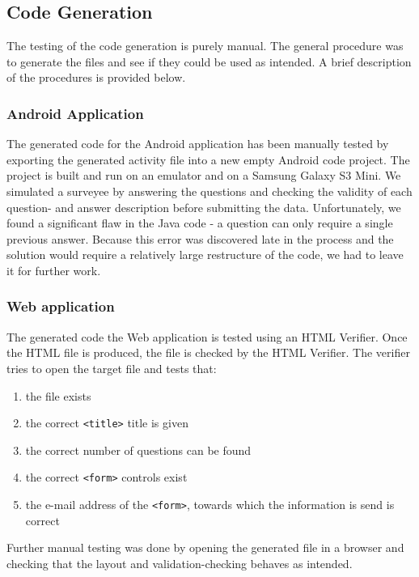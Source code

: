 \documentclass[runningheads]{llncs}
\begin{document}
\subsection{Code Generation}
The testing of the code generation is purely manual. The general procedure was to generate the files and see if they could be used as intended. A brief description of the procedures is provided below.
\subsubsection{Android Application}
The generated code for the Android application has been manually tested by exporting the generated activity file into a new empty Android code project. The project is built and run on an emulator and on a Samsung Galaxy S3 Mini. We simulated a surveyee by answering the questions and checking the validity of each question- and answer description before submitting the data. Unfortunately, we found a significant flaw in the Java code - a question can only require a single previous answer. Because this error was discovered late in the process and the solution would require a relatively large restructure of the code, we had to leave it for further work. 
\subsubsection{Web application}
The generated code the Web application is tested using an HTML Verifier. Once the HTML file is produced, the file is checked by the HTML Verifier. The verifier tries to open the target file and tests that:
\begin{enumerate}
\item the file exists
\item the correct \texttt{<title>} title is given
\item the correct number of questions can be found
\item the correct \texttt{<form>} controls exist
\item the e-mail address of the \texttt{<form>}, towards which the information is send is correct
\end{enumerate}
Further manual testing was done by opening the generated file in a browser and checking that the layout and validation-checking behaves as intended.
\end{document}
